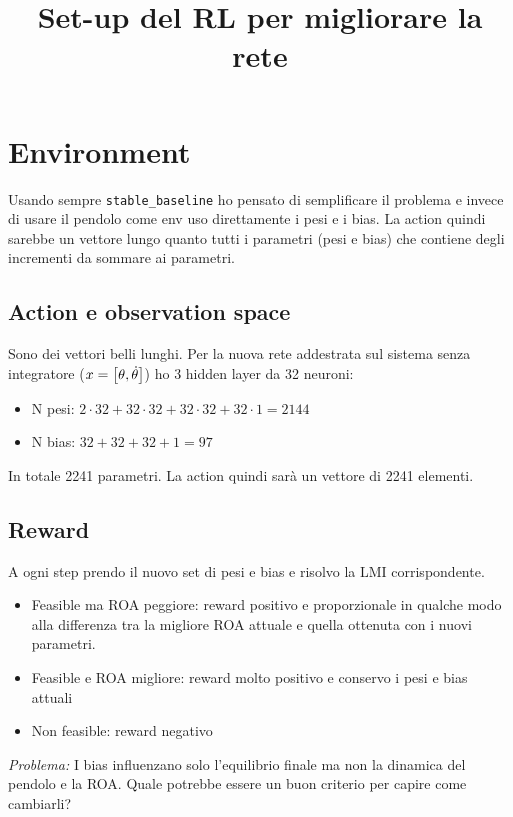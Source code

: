\documentclass{article}
\begin{document}
\date{}
\author{}

\title{Set-up del RL per migliorare la rete}
\maketitle

\section*{Environment}
Usando sempre \texttt{stable\_baseline} ho pensato di semplificare il problema e invece di usare il pendolo come env uso direttamente i pesi e i bias. La action quindi sarebbe un vettore lungo quanto tutti i parametri (pesi e bias) che contiene degli incrementi da sommare ai parametri. 

\subsection*{Action e observation space}
Sono dei vettori belli lunghi. Per la nuova rete addestrata sul sistema senza integratore ($x = \left[\begin{matrix}\theta, \dot{\theta}\end{matrix}\right]$) ho 3 hidden layer da 32 neuroni:
\begin{itemize}
  \item N pesi: $2 \cdot 32 + 32 \cdot 32 + 32 \cdot 32 + 32 \cdot 1 = 2144$
  \item N bias: $32 + 32 + 32 + 1 = 97$
\end{itemize}
In totale 2241 parametri. La action quindi sarà un vettore di 2241 elementi.

\subsection*{Reward}
A ogni step prendo il nuovo set di pesi e bias e risolvo la LMI corrispondente.
\begin{itemize}
  \item Feasible ma ROA peggiore: reward positivo e proporzionale in qualche modo alla differenza tra la migliore ROA attuale e quella ottenuta con i nuovi parametri.
  \item Feasible e ROA migliore: reward molto positivo e conservo i pesi e bias attuali
  \item Non feasible: reward negativo
\end{itemize}
\textit{Problema:} I bias influenzano solo l'equilibrio finale ma non la dinamica del pendolo e la ROA. Quale potrebbe essere un buon criterio per capire come cambiarli?
\end{document}
